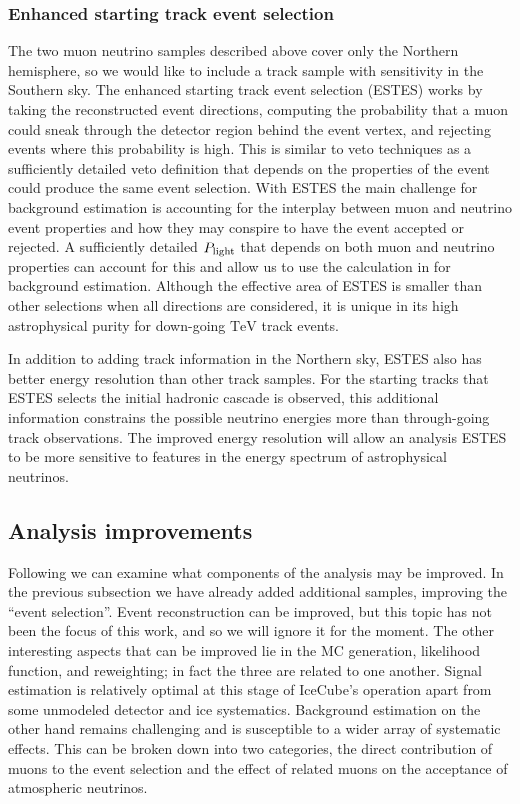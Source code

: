 \subsubsection{Enhanced starting track event selection}
The two muon neutrino samples described above cover only the Northern hemisphere, so we would like to include a track sample with sensitivity in the Southern sky.
The enhanced starting track event selection (ESTES) works by taking the reconstructed event directions, computing the probability that a muon could sneak through the detector region behind the event vertex, and rejecting events where this probability is high.
This is similar to veto techniques as a sufficiently detailed veto definition that depends on the properties of the event could produce the same event selection.
With ESTES the main challenge for background estimation is accounting for the interplay between muon and neutrino event properties and how they may conspire to have the event accepted or rejected.
A sufficiently detailed $P_{\rm light}$ that depends on both muon and neutrino properties can account for this and allow us to use the calculation in  for background estimation.
Although the effective area of ESTES is smaller than other selections when all directions are considered, it is unique in its high astrophysical purity for down-going $\si\TeV$ track events.

In addition to adding track information in the Northern sky, ESTES also has better energy resolution than other track samples.
For the starting tracks that ESTES selects the initial hadronic cascade is observed, this additional information constrains the possible neutrino energies more than through-going track observations.
The improved energy resolution will allow an analysis ESTES to be more sensitive to features in the energy spectrum of astrophysical neutrinos.

\subsection{Analysis improvements}
Following  we can examine what components of the analysis may be improved.
In the previous subsection we have already added additional samples, improving the ``event selection''.
Event reconstruction can be improved, but this topic has not been the focus of this work, and so we will ignore it for the moment.
The other interesting aspects that can be improved lie in the MC generation, likelihood function, and reweighting; in fact the three are related to one another.
Signal estimation is relatively optimal at this stage of IceCube's operation apart from some unmodeled detector and ice systematics.
Background estimation on the other hand remains challenging and is susceptible to a wider array of systematic effects.
This can be broken down into two categories, the direct contribution of muons to the event selection and the effect of related muons on the acceptance of atmospheric neutrinos.

